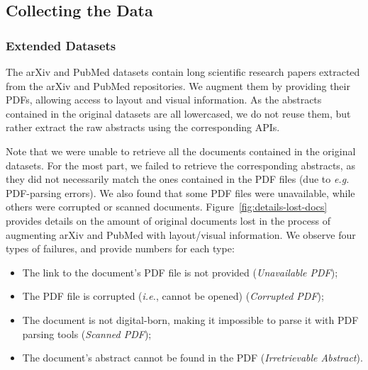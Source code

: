 \subsection{Collecting the Data}

\subsubsection{Extended Datasets}

The arXiv and PubMed datasets \citep{cohan2018discourse} contain long scientific research papers extracted from the arXiv and PubMed repositories. We augment them by providing their PDFs, allowing access to layout and visual information. As the abstracts contained in the original datasets are all lowercased, we do not reuse them, but rather extract the raw abstracts using the corresponding APIs.

Note that we were unable to retrieve all the documents contained in the original datasets. For the most part, we failed to retrieve the corresponding abstracts, as they did not necessarily match the ones contained in the PDF files (due to \textit{e.g.} PDF-parsing errors). We also found that some PDF files were unavailable, while others were corrupted or scanned documents. Figure~\ref{fig:details-lost-docs} provides details on the amount of original documents lost in the process of augmenting arXiv and PubMed with layout/visual information. We observe four types of failures, and provide numbers for each type: 

\begin{itemize}
    \item The link to the document's PDF file is not provided (\textit{Unavailable PDF});
    \item The PDF file is corrupted (\textit{i.e.}, cannot be opened) (\textit{Corrupted PDF});
    \item The document is not digital-born, making it impossible to parse it with PDF parsing tools (\textit{Scanned PDF});
    \item The document's abstract cannot be found in the PDF (\textit{Irretrievable Abstract}).
\end{itemize}


